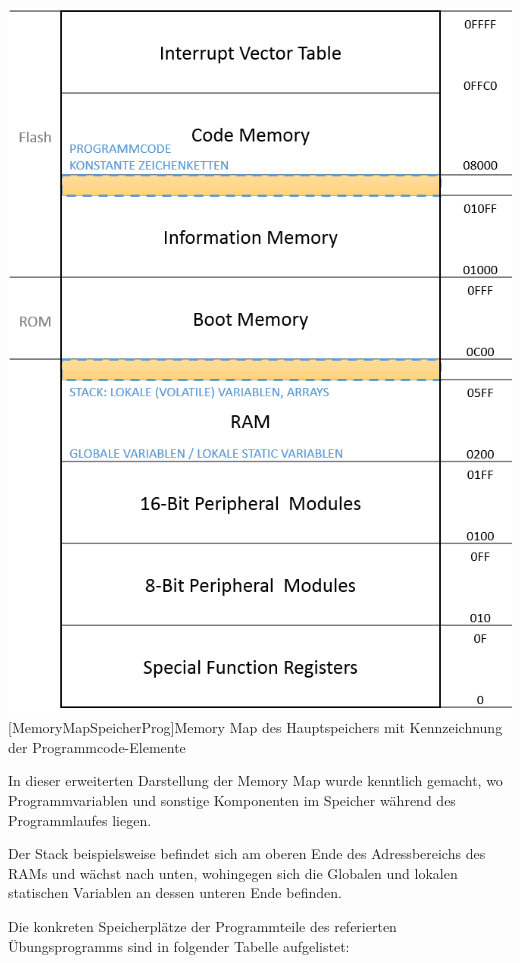 \documentclass[12pt,a4paper,bibliography=totocnumbered,listof=totocnumbered]{scrartcl}
\begin{document}
\vspace{1em}
\begin{minipage}{\linewidth}
	\centering
	\includegraphics[width=0.7\linewidth]{img/MemoryMapSpeicherProg.png}
	[MemoryMapSpeicherProg]{Memory Map des Hauptspeichers mit Kennzeichnung der Programmcode-Elemente}
	\label{fig:MemoryMapSpeicherProg}
\end{minipage}
\vspace{0.5em}

In dieser erweiterten Darstellung der Memory Map wurde kenntlich gemacht, wo Programmvariablen und sonstige Komponenten im Speicher während des Programmlaufes liegen. 

Der Stack beispielsweise befindet sich am oberen Ende des Adressbereichs des RAMs und wächst nach unten, wohingegen sich die Globalen und lokalen statischen Variablen an dessen unteren Ende befinden.

Die konkreten Speicherplätze der Programmteile des referierten Übungsprogramms sind in folgender Tabelle aufgelistet:
\end{document}
